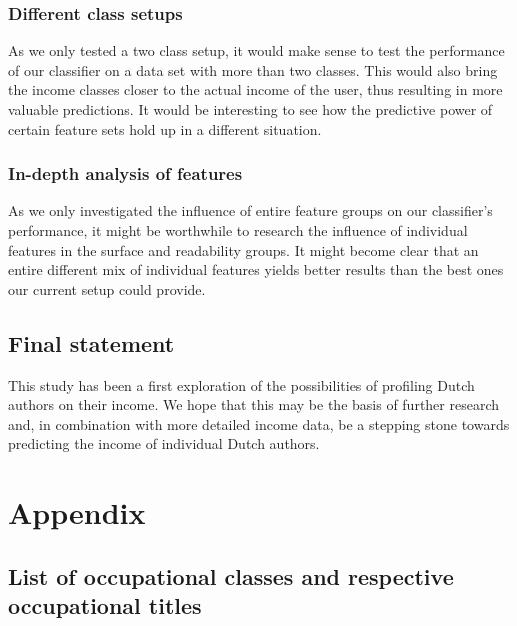 \documentclass[
10pt, %
a4paper, %
oneside, %
headinclude,footinclude, %
] {book}%
\begin{document}
\subsection{Different class setups}
As we only tested a two class setup, it would make sense to test the performance of our classifier on a data set with more than two classes. This would also bring the income classes closer to the actual income of the user, thus resulting in more valuable predictions. It would be interesting to see how the predictive power of certain feature sets hold up in a different situation.

\subsection{In-depth analysis of features}
As we only investigated the influence of entire feature groups on our classifier's performance, it might be worthwhile to research the influence of individual features in the surface and readability groups. It might become clear that an entire different mix of individual features yields better results than the best ones our current setup could provide.

\section{Final statement}
This study has been a first exploration of the possibilities of profiling Dutch authors on their income. We hope that this may be the basis of further research and, in combination with more detailed income data, be a stepping stone towards predicting the income of individual Dutch authors. 



 



\newpage
\appendix
\chapter{Appendix}
\section{List of occupational classes and respective occupational titles}
\end{document}

